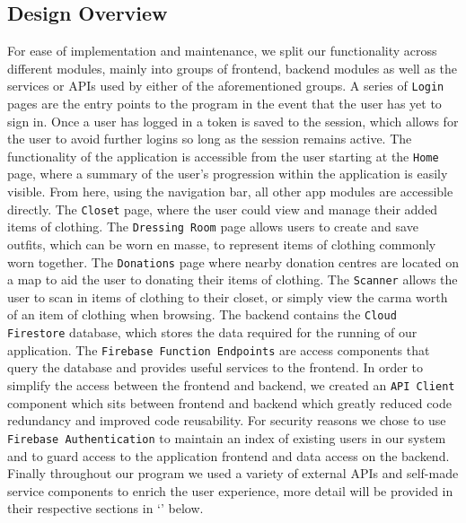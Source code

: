 \documentclass[a4paper, 11pt]{article}
\begin{document}
    \subsection{Design Overview}
      For ease of implementation and maintenance, we split our functionality
      across different modules, mainly into groups of frontend, backend modules
      as well as the services or APIs used by either of the aforementioned
      groups.
      \newline\newline
      A series of \texttt{Login} pages are the entry points to the program in
      the event that the user has yet to sign in. Once a user has logged in a
      token is saved to the session, which allows for the user to avoid further
      logins so long as the session remains active.
      \newline\newline
      The functionality of the application is accessible from the user starting
      at the \texttt{Home} page, where a summary of the user's progression
      within the application is easily visible. From here, using the navigation
      bar, all other app modules are accessible directly.
      \newline\newline
      The \texttt{Closet} page, where the user could view and manage their added
      items of clothing. The \texttt{Dressing Room} page allows users to create
      and save outfits, which can be worn en masse, to represent items of
      clothing commonly worn together. The \texttt{Donations} page where nearby
      donation centres are located on a map to aid the user to donating their
      items of clothing. The \texttt{Scanner} allows the user to scan in items
      of clothing to their closet, or simply view the carma worth of an item of
      clothing when browsing.
      \newline\newline
      The backend contains the \texttt{Cloud Firestore} database, which stores
      the data required for the running of our application. The \texttt{Firebase
      Function Endpoints} are access components that query the database and
      provides useful services to the frontend.
      \newline\newline
      In order to simplify the access between the frontend and backend, we
      created an \texttt{API Client} component which sits between frontend and
      backend which greatly reduced code redundancy and improved code
      reusability.
      \newline\newline
      For security reasons we chose to use \texttt{Firebase Authentication} to
      maintain an index of existing users in our system and to guard access to
      the application frontend and data access on the backend.
      \newline\newline
      Finally throughout our program we used a variety of external APIs and
      self-made service components to enrich the user experience, more detail
      will be provided in their respective sections in
      `' below.
\end{document}
